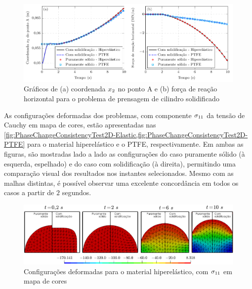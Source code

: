 \documentclass[Tese.tex]{subfiles}
\begin{document}
\begin{figure}[!htb]
	\centering
	\caption{Gráficos de (a) coordenada $x_2$ no ponto A e (b) força de reação horizontal para o problema de prensagem de cilindro solidificado}
	\label{fig:PhaseChangeConsistencyTest2D-DisplacementAndPressure}
	\includegraphics[scale=1.0]{Figuras/PhaseChangeConsistencyTest2D/DisplacementAndPressure.pdf}
\end{figure}

As configurações deformadas dos problemas, com componente ${\sigma}_{11}$ da tensão de Cauchy em mapa de cores, estão apresentadas nas \cref{fig:PhaseChangeConsistencyTest2D-Elastic,fig:PhaseChangeConsistencyTest2D-PTFE} para o material hiperelástico e o PTFE, respectivamente. Em ambas as figuras, são mostradas lado a lado as configurações do caso puramente sólido (à esquerda, espelhado) e do caso com solidificação (à direita), permitindo uma comparação visual dos resultados nos instantes selecionados. Mesmo com as malhas distintas, é possível observar uma excelente concordância em todos os casos a partir de $2$ segundos.

\begin{figure}[!htb]
	\centering
	\caption{Configurações deformadas para o material hiperelástico, com ${\sigma}_{11}$ em mapa de cores}
	\label{fig:PhaseChangeConsistencyTest2D-Elastic}
	\includegraphics[width=\textwidth]{Figuras/PhaseChangeConsistencyTest2D/Elastic.png}
\end{figure}
\end{document}
